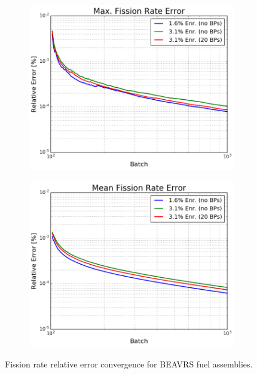\begin{figure}[h!]
\centering
\begin{subfigure}{0.5\textwidth}
  \centering
  \includegraphics[width=\linewidth]{figures/benchmarks/fission-rates/fiss-conv-max-assms}
  \caption{}
  \label{fig:chap7-fiss-rate-max-conv-assms}
\end{subfigure}%
\begin{subfigure}{0.5\textwidth}
  \centering
  \includegraphics[width=\linewidth]{figures/benchmarks/fission-rates/fiss-conv-mean-assms}
  \caption{}
  \label{fig:chap7-fiss-rate-max-conv-assms}
\end{subfigure}%
\caption[Fission rate error convergence for BEAVRS assemblies]{Fission rate relative error convergence for \ac{BEAVRS} fuel assemblies.}
\label{fig:chap7-fiss-rates-conv-assm}
\end{figure}

